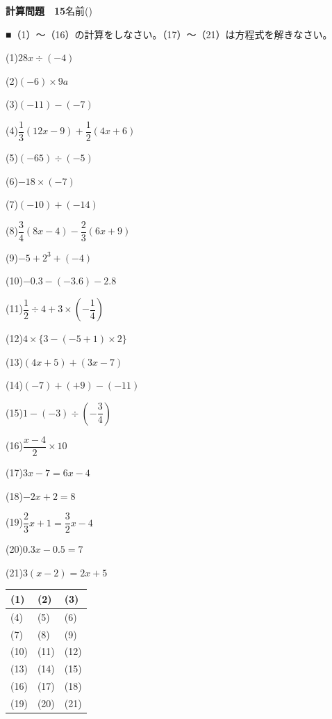 \documentclass[a4paper,11pt]{ltjsarticle}
\newlength{\qcol}\setlength{\qcol}{0.47\textwidth}
\newlength{\qgap}
\newlength{\anscolw}\setlength{\anscolw}{0.30\textwidth}
\newlength{\ansh}
\newcommand{\Q}[2]{\parbox[t]{\qcol}{\raggedright (#1)\hspace{0.6em}$\displaystyle #2$}}
\newcommand{\QR}[4]{\Q{#1}{#2}\hfill\Q{#3}{#4}\par\vspace{\qgap}}
\newcommand{\anscell}[1]{\rule[-\ansdrop]{0pt}{\ansh}(#1)}
\newlength{\ansdrop}
\begin{document}
{\large\bfseries 計算問題　15}\hfill 名前(\underline{\hspace{32mm}})\par\vspace{3mm}
■（1）〜（16）の計算をしなさい。（17）〜（21）は方程式を解きなさい。\par\vspace{3mm}
\setlength{\qgap}{5.4mm}
\QR{1}{28x\div(-4)}{2}{(-6)\times9a}
\QR{3}{(-11)-(-7)}{4}{\dfrac{1}{3}(12x-9)+\dfrac{1}{2}(4x+6)}
\QR{5}{(-65)\div(-5)}{6}{-18\times(-7)}
\QR{7}{(-10)+(-14)}{8}{\dfrac{3}{4}(8x-4)-\dfrac{2}{3}(6x+9)}
\QR{9}{-5+2^3+(-4)}{10}{-0.3-(-3.6)-2.8}
\QR{11}{\dfrac{1}{2}\div4+3\times\left(-\dfrac{1}{4}\right)}{12}{4\times\{3-(-5+1)\times2\}}
\QR{13}{(4x+5)+(3x-7)}{14}{(-7)+(+9)-(-11)}
\QR{15}{1-(-3)\div\left(-\dfrac{3}{4}\right)}{16}{\dfrac{x-4}{2}\times10}
\QR{17}{3x-7=6x-4}{18}{-2x+2=8}
\QR{19}{\dfrac{2}{3}x+1=\dfrac{3}{2}x-4}{20}{0.3x-0.5=7}
\vspace{1mm}
\Q{21}{3(x-2)=2x+5}\par\vspace{3mm}
\setlength{\ansh}{9.5mm}\setlength{\ansdrop}{6mm}%
\begin{center}\begin{tabular}{|p{\anscolw}|p{\anscolw}|p{\anscolw}|}\hline
\anscell{1} & \anscell{2} & \anscell{3} \\\hline
\anscell{4} & \anscell{5} & \anscell{6} \\\hline
\anscell{7} & \anscell{8} & \anscell{9} \\\hline
\anscell{10} & \anscell{11} & \anscell{12} \\\hline
\anscell{13} & \anscell{14} & \anscell{15} \\\hline
\anscell{16} & \anscell{17} & \anscell{18} \\\hline
\anscell{19} & \anscell{20} & \anscell{21} \\\hline
\end{tabular}\end{center}
\end{document}
